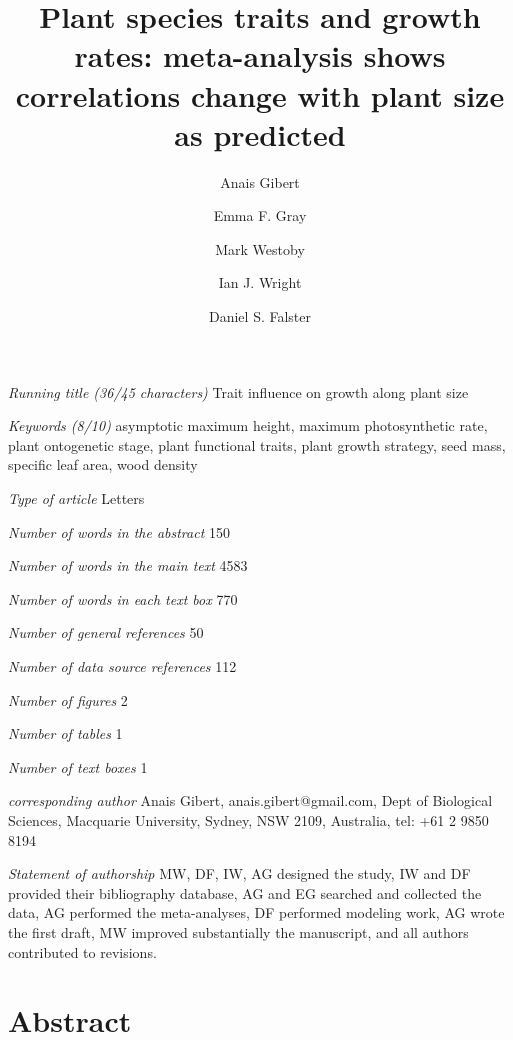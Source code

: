 \documentclass[a4paper]{article}\usepackage[]{graphicx}\usepackage[]{color}
\begin{document}
\newpage

\title{Plant species traits and growth rates: meta-analysis shows correlations change with plant size as predicted}

\author[1]{Anais Gibert}
\author[1]{Emma F. Gray}
\author[1]{Mark Westoby}
\author[1]{Ian J. Wright}
\author[1]{Daniel S. Falster}




\maketitle

\textit{Running title (36/45 characters)} Trait influence on growth along plant size

\textit{Keywords (8/10)} asymptotic maximum height, maximum photosynthetic rate, plant ontogenetic stage, plant functional traits, plant growth strategy, seed mass, specific leaf area, wood density 

\textit{Type of article} Letters

\textit{Number of words in the abstract} 150

\textit{Number of words in the main text} 4583

\textit{Number of words in each text box} 770

\textit{Number of general references} 50

\textit{Number of data source references} 112

\textit{Number of figures} 2

\textit{Number of tables} 1

\textit{Number of text boxes} 1

\textit{corresponding author} Anais Gibert, anais.gibert@gmail.com, Dept of Biological Sciences, Macquarie University, Sydney, NSW 2109, Australia, tel: +61 2 9850 8194

\textit{Statement of authorship} MW, DF, IW, AG designed the study, IW and DF provided their bibliography database, AG and EG searched and collected the data, AG performed the meta-analyses, DF performed modeling work, AG wrote the first draft, MW improved substantially the manuscript, and all authors contributed to revisions.



\newpage

\section*{Abstract}\label{abstract}
\end{document}
